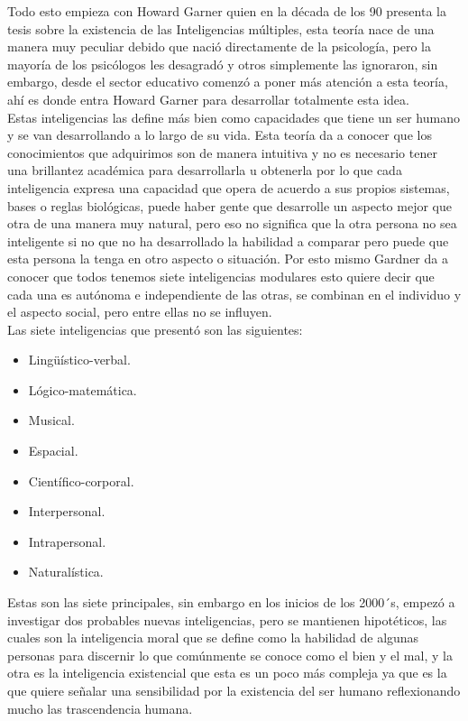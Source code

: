 Todo esto empieza con Howard Garner quien en la década de los 90 presenta la
tesis sobre la existencia de las Inteligencias múltiples, esta teoría nace de
una manera muy peculiar debido que nació directamente de la psicología, pero la
mayoría de los psicólogos les desagradó y otros simplemente las ignoraron, sin
embargo, desde el sector educativo comenzó a poner más atención a esta teoría,
ahí es donde entra Howard Garner para desarrollar totalmente esta idea.\\
Estas inteligencias las define más bien como capacidades que tiene un ser humano
y se van desarrollando a lo largo de su vida. Esta teoría da a conocer que los
conocimientos que adquirimos son de manera intuitiva y no es necesario tener una
brillantez académica para desarrollarla u obtenerla por lo que cada inteligencia
expresa una capacidad que opera de acuerdo a sus propios sistemas, bases o
reglas biológicas, puede haber gente que desarrolle un aspecto mejor que otra de
una manera muy natural, pero eso no significa que la otra persona no sea
inteligente si no que no ha desarrollado la habilidad a comparar pero puede que
esta persona la tenga en otro aspecto o situación. Por esto mismo Gardner da a
conocer que todos tenemos siete inteligencias modulares esto quiere decir que
cada una es autónoma e independiente de las otras, se combinan en el individuo y
el aspecto social, pero entre ellas no se influyen.\\
Las siete inteligencias que present\'o son las siguientes:
\begin{itemize}
\item Lingüístico-verbal.
\item Lógico-matemática.
\item Musical.
\item Espacial.
\item Científico-corporal.
\item Interpersonal.
\item Intrapersonal.
\item Naturalística.
\end{itemize}
Estas son las siete principales, sin embargo en los inicios de los 2000´s,
empezó a investigar dos probables nuevas inteligencias, pero se mantienen
hipotéticos, las cuales son la inteligencia moral que se define como la
habilidad de algunas personas para discernir lo que comúnmente se conoce como el
bien y el mal, y la otra es la inteligencia existencial que esta es un poco más
compleja ya que es la que quiere señalar una sensibilidad por la existencia del
ser humano reflexionando mucho las trascendencia humana.\\
